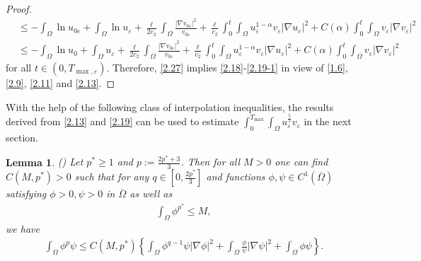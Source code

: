 \documentclass[12pt]{article}
\theoremstyle{plain}
\newtheorem{lemma}{Lemma}[section]
\theoremstyle{definition}
\numberwithin{equation}{section}
\begin{document}
\begin{proof}
\begin{align}
    &\leq -\int_{\Omega}\ln{u_{0\varepsilon}}+\int_{\Omega}\ln{u_{\varepsilon}}+\frac{\ell}{2c_2}\int_{\Omega} \frac{|\nabla v_{0\varepsilon}|^2}{v_{0\varepsilon}}+ \frac{\ell}{c_2} \int_0^t\int_{\Omega}u_{\varepsilon}^{1-\alpha}v_{\varepsilon}|\nabla u_{\varepsilon }|^2+C(\alpha)\int_0^t\int_{\Omega} v_{\varepsilon} |\nabla v_{\varepsilon }|^2\nonumber\\
    &\leq -\int_{\Omega}\ln{u_0}+\int_{\Omega}u_{\varepsilon}+\frac{\ell}{2c_2}\int_{\Omega} \frac{|\nabla v_{0\varepsilon}|^2}{v_{0\varepsilon}}+ \frac{\ell}{c_2} \int_0^t\int_{\Omega}u_{\varepsilon}^{1-\alpha}v_{\varepsilon}|\nabla u_{\varepsilon }|^2+C(\alpha)\int_0^t\int_{\Omega} v_{\varepsilon} |\nabla v_{\varepsilon }|^2
\end{align}
for all $t \in(0, T_{\max, \varepsilon})$. Therefore,
 \eqref{2.27}  implies \eqref{2.18}-\eqref{2.19-1} in  view of \eqref{1.6}, \eqref{2.9}, \eqref{2.11} and \eqref{2.13}.
\end{proof}

With the help of the following class of interpolation inequalities, the results derived from \eqref{2.13} and \eqref{2.19} can be used to estimate $\int_0^{T_{\max}}\int_\Omega u_{\varepsilon}^{\frac{5}{3}}v_{\varepsilon}$ in the next section.
\begin{lemma}\label{lemma2.6}(\cite{WCVPDE})
Let $p^*\geq1$ and $p:=\frac{2p^*+3}{3}$. Then for all $M>0$ one can find $C(M,p^*)>0$ such that for any $q\in[0,\frac{2p^*}{3}]$ and   functions $\phi,\psi\in C^1(\overline{\Omega})$ satisfying $\phi>0,\psi>0$ in $\overline{\Omega}$ as well as
\begin{align*}
    \int_{\Omega}\phi^{p^*}\leq M,
\end{align*}
we have
\begin{align}\label{eq2.28}
    \int_{\Omega}\phi^{p}\psi\leq C(M,p^*) \left\{\int_{\Omega}\phi^{q-1}\psi|\nabla \phi|^2+\int_{\Omega}\frac{\phi}{\psi}|\nabla
    \psi|^2+\int_{\Omega}\phi\psi\right\}.
\end{align}
\end{lemma}
\end{document}
